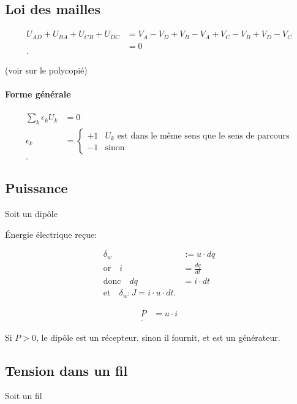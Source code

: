 \documentclass{article}
\begin{document}
\subsection{Loi des mailles}

\begin{align*}
	U_{AD}+U_{BA}+U_{CB}+U_{DC} &= V_A-V_D+V_B-V_A+V_C-V_B+V_D-V_C \\
	&= 0 \\
.\end{align*}

(voir sur le polycopié)

\paragraph{Forme générale}

\begin{align*}
	\sum_{k}^{} \epsilon_k U_k &= 0 \\
	\epsilon_k &= \begin{cases}
		+1 &\text{$U_k$ est dans le même sens que le sens de parcours} \\
		-1 &\text{sinon}
	\end{cases} \\
.\end{align*}

\subsection{Puissance}
Soit un dipôle


Énergie électrique reçue:

\begin{align*}
	\delta_w &:= u \cdot dq \\
	\text{or}\quad i &= \frac{dq}{dt} \\
	\text{donc}\quad dq &= i\cdot dt \\
	\text{et}\quad \delta_w: J = i\cdot u\cdot dt
.\end{align*}

\begin{align*}
	P &= u\cdot i \\
.\end{align*}

Si $P > 0$, le dipôle est un récepteur. sinon il fournit, et est un générateur.

\subsection{Tension dans un fil}
Soit un fil
\end{document}
